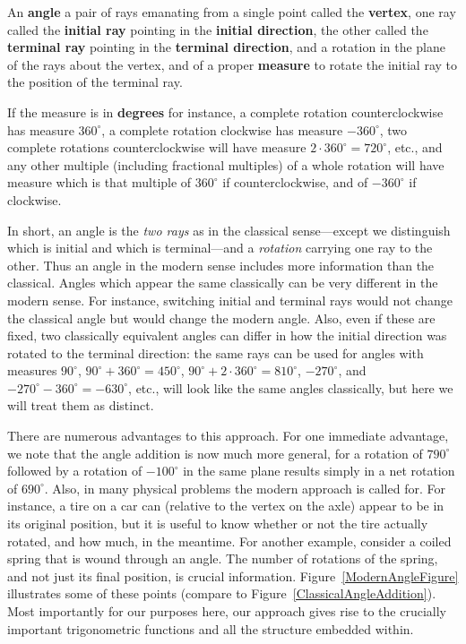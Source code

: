 \begin{definition}
An {\rm\bf angle} a pair of rays emanating from
a single point called the {\rm\bf vertex}, one ray called the 
{\rm\bf initial ray} pointing in the {\rm\bf initial direction},
the other called the {\rm\bf terminal ray} pointing in
the {\rm\bf terminal direction}, and a rotation
in the plane of the rays about the vertex, 
and of a proper {\rm\bf measure} to rotate the initial ray 
to the position of the terminal ray.

If the measure is in {\rm\bf degrees} for instance, 
a complete rotation
counterclockwise has measure $360^\circ$, a complete
rotation clockwise has measure $-360^\circ$,
two complete rotations counterclockwise will have measure 
$2\cdot360^\circ=720^\circ$, etc., and any other multiple
(including fractional multiples) of a whole
rotation will have measure which is that multiple of $360^\circ$
if counterclockwise, and of $-360^\circ$ if clockwise.
\end{definition}

In short, an angle is the {\it two rays}
 as in the classical sense---except
we distinguish which is initial and which is terminal---and
a {\it rotation} carrying one ray to the other.
Thus an angle in the modern sense includes more information
than the classical.
Angles which appear the same
classically can be very different in the modern sense.
For instance, switching initial and terminal rays would not 
change the classical angle but would change the modern 
angle.  Also, even if these 
are fixed, two classically equivalent angles
can differ in how the initial direction was rotated to
the terminal direction: the same rays can be used for  
angles with measures $90^\circ$, $90^\circ+360^\circ=450^\circ$, 
$90^\circ+2\cdot360^\circ=810^\circ$, 
$-270^\circ$, and $-270^\circ-360^\circ=-630^\circ$, etc.,
will look like the same angles classically, but here we will
treat them as distinct.

There are numerous advantages to this approach.
For one immediate advantage, we note that
the angle addition is now much more general, for 
a rotation of $790^\circ$ followed by a rotation of 
$-100^\circ$ in the same plane
results simply in a net rotation of $690^\circ$.
Also, in many physical problems the modern approach is called
for.  For instance, a tire on a car can (relative to the 
vertex on the axle) appear to be in its original position,
but it is useful to know whether or not the tire 
actually rotated, and how much, in the meantime.
For another example, consider a coiled spring that is wound
through an angle.  The number of rotations of the spring,
and not just its final position, is crucial information.
Figure~\ref{ModernAngleFigure} illustrates some of these 
points (compare to Figure~\ref{ClassicalAngleAddition}).
Most importantly for our purposes here, our approach gives rise
to the crucially important trigonometric functions and
all the structure embedded within.

